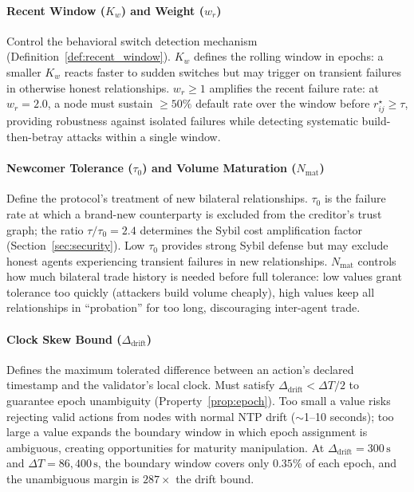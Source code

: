 \documentclass[11pt]{article}
\begin{document}
\paragraph{Recent Window ($K_w$) and Weight ($w_r$)}
Control the behavioral switch detection mechanism (Definition~\ref{def:recent_window}). $K_w$ defines the rolling window in epochs: a smaller $K_w$ reacts faster to sudden switches but may trigger on transient failures in otherwise honest relationships. $w_r \geq 1$ amplifies the recent failure rate: at $w_r = 2.0$, a node must sustain $\geq 50\%$ default rate over the window before $r^\star_{ij} \geq \tau$, providing robustness against isolated failures while detecting systematic build-then-betray attacks within a single window.

\paragraph{Newcomer Tolerance ($\tau_0$) and Volume Maturation ($N_{\text{mat}}$)}
Define the protocol's treatment of new bilateral relationships. $\tau_0$ is the failure rate at which a brand-new counterparty is excluded from the creditor's trust graph; the ratio $\tau/\tau_0 = 2.4$ determines the Sybil cost amplification factor (Section~\ref{sec:security}). Low $\tau_0$ provides strong Sybil defense but may exclude honest agents experiencing transient failures in new relationships. $N_{\text{mat}}$ controls how much bilateral trade history is needed before full tolerance: low values grant tolerance too quickly (attackers build volume cheaply), high values keep all relationships in ``probation'' for too long, discouraging inter-agent trade.

\paragraph{Clock Skew Bound ($\Delta_{\text{drift}}$)}
Defines the maximum tolerated difference between an action's declared timestamp and the validator's local clock. Must satisfy $\Delta_{\text{drift}} < \Delta T / 2$ to guarantee epoch unambiguity (Property~\ref{prop:epoch}). Too small a value risks rejecting valid actions from nodes with normal NTP drift ($\sim$1--10 seconds); too large a value expands the boundary window in which epoch assignment is ambiguous, creating opportunities for maturity manipulation. At $\Delta_{\text{drift}} = 300\,\text{s}$ and $\Delta T = 86{,}400\,\text{s}$, the boundary window covers only $0.35\%$ of each epoch, and the unambiguous margin is $287\times$ the drift bound.
\end{document}
